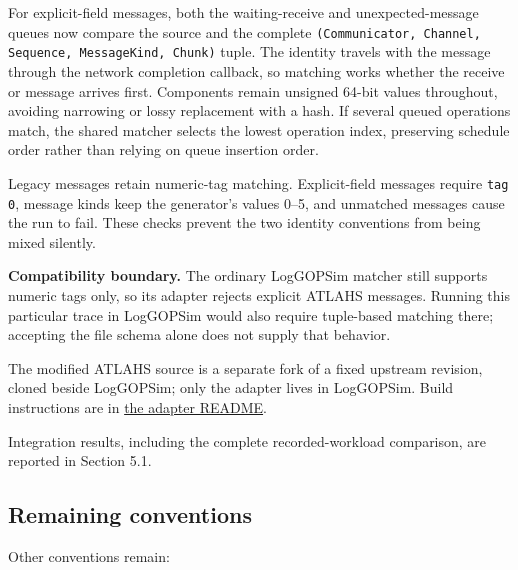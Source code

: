 \documentclass[10pt,a4paper]{article}
\begin{document}
 For explicit-field messages, both the waiting-receive and unexpected-message queues now compare the source and the complete \texttt{(Communicato\allowbreak{}r, Channel, \allowbreak{}Sequence, Me\allowbreak{}ssageKind, C\allowbreak{}hunk)} tuple. The identity travels with the message through the network completion callback, so matching works whether the receive or message arrives first. Components remain unsigned 64-bit values throughout, avoiding narrowing or lossy replacement with a hash. If several queued operations match, the shared matcher selects the lowest operation index, preserving schedule order rather than relying on queue insertion order.

Legacy messages retain numeric-tag matching. Explicit-field messages require \texttt{tag 0}, message kinds keep the generator's values 0--5, and unmatched messages cause the run to fail. These checks prevent the two identity conventions from being mixed silently.

\textbf{Compatibility boundary.} The ordinary LogGOPSim matcher still supports numeric tags only, so its adapter rejects explicit ATLAHS messages. Running this particular trace in LogGOPSim would also require tuple-based matching there; accepting the file schema alone does not supply that behavior.

The modified ATLAHS source is a separate fork of a fixed upstream revision, cloned beside LogGOPSim; only the adapter lives in LogGOPSim. Build instructions are in \href{\detokenize{../src/LogGOPSim/simulators/atlahs/README.md}}{the adapter README}.

Integration results, including the complete recorded-workload comparison, are reported in Section 5.1.

\hypertarget{remaining-conventions}{}
\subsection{Remaining conventions}

Other conventions remain:
\end{document}
